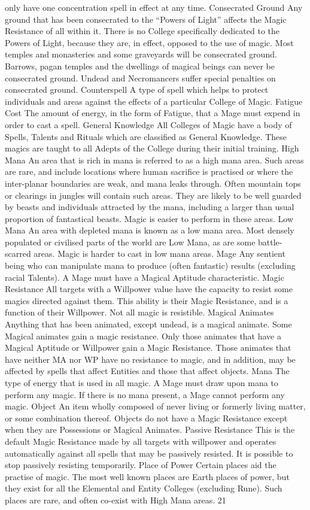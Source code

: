\documentclass[a4paper]{article}
\begin{document}
\begin{multicols}{3}
only have one concentration spell in effect at any
time.
Consecrated Ground Any ground that has been
consecrated to the “Powers of Light” affects the
Magic Resistance of all within it. There is no College specifically dedicated to the Powers of Light,
because they are, in effect, opposed to the use of
magic. Most temples and monasteries and some
graveyards will be consecrated ground. Barrows,
pagan temples and the dwellings of magical beings
can never be consecrated ground. Undead and
Necromancers suffer special penalties on consecrated ground.
Counterspell A type of spell which helps to protect individuals and areas against the effects of a
particular College of Magic.
Fatigue Cost The amount of energy, in the form of
Fatigue, that a Mage must expend in order to cast a
spell.
General Knowledge All Colleges of Magic have a
body of Spells, Talents and Rituals which are classified as General Knowledge. These magics are
taught to all Adepts of the College during their
initial training.
High Mana An area that is rich in mana is referred
to as a high mana area. Such areas are rare, and
include locations where human sacrifice is practised or where the inter-planar boundaries are
weak, and mana leaks through. Often mountain
tops or clearings in jungles will contain such areas.
They are likely to be well guarded by beasts and
individuals attracted by the mana, including a
larger than usual proportion of fantastical beasts.
Magic is easier to perform in these areas.
Low Mana An area with depleted mana is known
as a low mana area. Most densely populated or
civilised parts of the world are Low Mana, as are
some battle-scarred areas. Magic is harder to cast
in low mana areas.
Mage Any sentient being who can manipulate
mana to produce (often fantastic) results (excluding
racial Talents). A Mage must have a Magical Aptitude characteristic.
Magic Resistance All targets with a Willpower
value have the capacity to resist some magics
directed against them. This ability is their Magic
Resistance, and is a function of their Willpower.
Not all magic is resistible.
Magical Animates Anything that has been animated, except undead, is a magical animate. Some
Magical animates gain a magic resistance. Only
those animates that have a Magical Aptitude or
Willpower gain a Magic Resistance. Those animates that have neither MA nor WP have no resistance to magic, and in addition, may be affected by
spells that affect Entities and those that affect
objects.
Mana The type of energy that is used in all magic.
A Mage must draw upon mana to perform any
magic. If there is no mana present, a Mage cannot
perform any magic.
Object An item wholly composed of never living
or formerly living matter, or some combination
thereof. Objects do not have a Magic Resistance
except when they are Possessions or Magical Animates.
Passive Resistance This is the default Magic Resistance made by all targets with willpower and
operates automatically against all spells that may
be passively resisted. It is possible to stop passively resisting temporarily.
Place of Power Certain places aid the practise of
magic. The most well known places are Earth
places of power, but they exist for all the Elemental
and Entity Colleges (excluding Rune). Such places
are rare, and often co-exist with High Mana areas.
21


\end{multicols}
\end{document}
